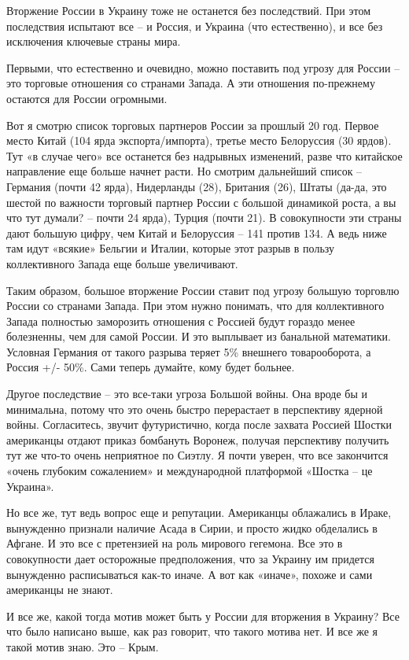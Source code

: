 Вторжение России в Украину тоже не останется без последствий. При этом
последствия испытают все – и Россия, и Украина (что естественно), и все без
исключения ключевые страны мира.

Первыми, что естественно и очевидно, можно поставить под угрозу для России –
это торговые отношения со странами Запада. А эти отношения по-прежнему остаются
для России огромными.

Вот я смотрю список торговых партнеров России за прошлый 20 год. Первое место
Китай (104 ярда экспорта/импорта), третье место Белоруссия (30 ярдов). Тут «в
случае чего» все останется без надрывных изменений, разве что китайское
направление еще больше начнет расти. Но смотрим дальнейший список – Германия
(почти 42 ярда), Нидерланды (28), Британия (26), Штаты (да-да, это шестой по
важности торговый партнер России с большой динамикой роста, а вы что тут
думали? – почти 24 ярда), Турция (почти 21). В совокупности эти страны дают
большую цифру, чем Китай и Белоруссия – 141 против 134. А ведь ниже там идут
«всякие» Бельгии и Италии, которые этот разрыв в пользу коллективного Запада
еще больше увеличивают.

Таким образом, большое вторжение России ставит под угрозу большую торговлю
России со странами Запада. При этом нужно понимать, что для коллективного
Запада полностью заморозить отношения с Россией будут гораздо менее болезненны,
чем для самой России. И это выплывает из банальной математики. Условная
Германия от такого разрыва теряет 5\% внешнего товарооборота, а Россия +/- 50\%.
Сами теперь думайте, кому будет больнее.

Другое последствие – это все-таки угроза Большой войны. Она вроде бы и
минимальна, потому что это очень быстро перерастает в перспективу ядерной
войны. Согласитесь, звучит футуристично, когда после захвата Россией Шостки
американцы отдают приказ бомбануть Воронеж, получая перспективу получить тут же
что-то очень неприятное по Сиэтлу. Я почти уверен, что все закончится «очень
глубоким сожалением» и международной платформой «Шостка – це Украина».

Но все же, тут ведь вопрос еще и репутации. Американцы облажались в Ираке,
вынужденно признали наличие Асада в Сирии, и просто жидко обделались в Афгане.
И это все с претензией на роль мирового гегемона. Все это в совокупности дает
осторожные предположения, что за Украину им придется вынужденно расписываться
как-то иначе. А вот как «иначе», похоже и сами американцы не знают.

И все же, какой тогда мотив может быть у России для вторжения в Украину? Все
что было написано выше, как раз говорит, что такого мотива нет. И все же я
такой мотив знаю. Это – Крым.

